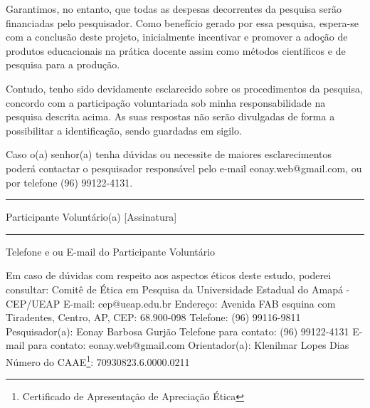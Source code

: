 \begin{apendicesenv}
Garantimos, no entanto, que todas as despesas decorrentes da pesquisa serão financiadas pelo pesquisador. Como benefício gerado por essa pesquisa, espera-se com a conclusão deste projeto, inicialmente incentivar e promover a adoção de produtos educacionais na prática docente assim como métodos científicos e de pesquisa para a produção.



Contudo, tenho sido devidamente esclarecido sobre os procedimentos da
pesquisa, concordo com a participação voluntariada sob minha responsabilidade na pesquisa descrita acima. As suas respostas  não serão divulgadas de forma a possibilitar a identificação, sendo guardadas em sigilo.

Caso o(a) senhor(a) tenha dúvidas ou necessite de maiores esclarecimentos poderá contactar o pesquisador responsável pelo e-mail eonay.web@gmail.com, ou por telefone (96) 99122-4131.



\hfill \break
\begin{center}
\rule{90mm}{1pt}

Participante Voluntário(a) [Assinatura]
\end{center}

\hfill \break
\begin{center}
\rule{90mm}{1pt}

Telefone e ou E-mail do Participante Voluntário
\end{center}


\hfill \break

Em caso de dúvidas com respeito aos aspectos éticos deste estudo, poderei consultar:
\newline
\newline
Comitê de Ética em Pesquisa da Universidade Estadual do Amapá - CEP/UEAP
\newline 
E-mail: cep@ueap.edu.br
\newline 
Endereço: Avenida FAB esquina com Tiradentes, Centro, AP, CEP: 68.900-098
\newline 
Telefone: (96) 99116-9811
\newline
\hfill
\newline
Pesquisador(a): Eonay Barbosa Gurjão
\newline
Telefone para contato: (96) 99122-4131
\newline
E-mail para contato: eonay.web@gmail.com
\newline
Orientador(a): Klenilmar Lopes Dias
\newline
\newline
Número do CAAE\footnote{Certificado de Apresentação de Apreciação Ética}: 70930823.6.0000.0211








\end{apendicesenv}
